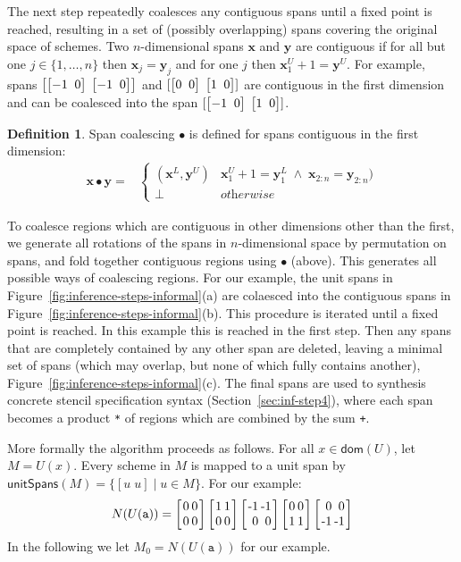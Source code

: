 \documentclass[9pt]{sigplanconf}
\newcounter{block}
\theoremstyle{definition}
\newtheorem{definition}[block]{Definition}
\newcommand{\vect}[1]{\textbf{#1}}
\newcommand{\vtwoh}[2]{\setlength{\arraycolsep}{0em}
\left[\begin{array}{cc}#1 \; & \; #2\end{array}\right]}
\newcommand{\vtwo}[2]{\setlength{\arraycolsep}{0em}
\left[\begin{array}{l}#1\\#2\end{array}\right]}
\newcommand{\stwo}[4]
{\setlength{\arraycolsep}{0.1em}
\left[\begin{array}{rr}$#1$ & $#3$\\$#2$ & $#4$\end{array}\right]}
\begin{document}
The next step repeatedly coalesces any contiguous spans
until a fixed point is reached, resulting in a set of (possibly
overlapping) spans covering the original space of schemes. Two $n$-dimensional spans $\vect{x}$ and $\vect{y}$
are contiguous if for all but one $j \in \{1, \ldots, n\}$ then
$\vect{x}_j = \vect{y}_j$ and for one $j$ then $\vect{x}^U_1 + 1 =
\vect{y}^U$. For example, spans
$\left[\vtwoh{-1}{0}\; \vtwoh{-1}{0}\right]$ and $[\vtwoh{0}{0} \; \vtwoh{1}{0}]$ 
are contiguous in the first dimension and can be coalesced
into the span $[\vtwoh{-1}{0} \; \vtwoh{1}{0}]$.

\begin{definition}\label{def:span-coalesc} Span
  coalescing $\bullet$ is defined for spans contiguous in the first dimension:
\begin{align*}
\vect{x} \bullet \vect{y}
= &
\begin{cases}
(\vect{x}^L, \vect{y}^U) & \vect{x}^U_1 + 1 = \vect{y}^L_1 \; \wedge \;
\vect{x}_{2:n} = \vect{y}_{2:n}) \\
\bot  & \textit{otherwise}
\end{cases}
\end{align*}
\end{definition}
\noindent
To coalesce regions which are contiguous in other dimensions
other than the first, we generate all rotations of the spans in
$n$-dimensional space by permutation on spans, and fold together contiguous
regions using $\bullet$ (above). This 
generates all possible ways of coalescing regions. For our example,
the unit spans in Figure~\ref{fig:inference-steps-informal}(a)
are colaesced into the contiguous spans in
Figure~\ref{fig:inference-steps-informal}(b).
This procedure is iterated until a fixed point is reached. In this
example this is reached in the first step. 
 Then any spans that are completely contained by any other span are deleted,
leaving a minimal set of spans (which may overlap, but none of which
fully contains another), Figure~\ref{fig:inference-steps-informal}(c).
The final spans are used to synthesis concrete stencil specification
syntax (Section~\ref{sec:inf-step4}), where
each span becomes a product \texttt{*} of regions which are 
combined by the sum \texttt{+}.

More formally the algorithm proceeds as follows.
For all $x \in \mathsf{dom}(U)$, let $M = U(x)$. Every scheme in $M$ 
is mapped to a unit span
by $\textsf{unitSpans}(M) = \{[u \; u] \mid u\!\in\!M\}$. For our example:
\begin{align*}
N(U(\texttt{a})) = \stwo{0}{0}{0}{0} \stwo{1}{0}{1}{0} \stwo{-1}{0}{-1}{0} \stwo{0}{1}{0}{1} \stwo{0}{-1}{0}{-1}
\end{align*}
In the following we let $M_0 = N(U(\texttt{a}))$ for our example.
\end{document}
